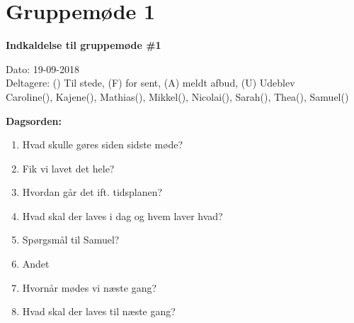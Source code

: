 \section{Gruppemøde 1}

\vspace{0.5 cm}
\textbf{Indkaldelse til gruppemøde \#1}

Dato: 19-09-2018 \\
Deltagere: () Til stede, (F) for sent, (A) meldt afbud, (U) Udeblev \\
Caroline(), Kajene(), Mathias(), Mikkel(), Nicolai(), Sarah(), Thea(), Samuel() 

\vspace{0.1 cm}
\textbf{Dagsorden:}

\begin{enumerate}
	\item Hvad skulle gøres siden sidste møde?
	\item Fik vi lavet det hele?
	\item Hvordan går det ift. tidsplanen?
	\item Hvad skal der laves i dag og hvem laver hvad?
	\item Spørgsmål til Samuel?
	\item Andet
	\item Hvornår mødes vi næste gang?
	\item Hvad skal der laves til næste gang?
\end{enumerate}

